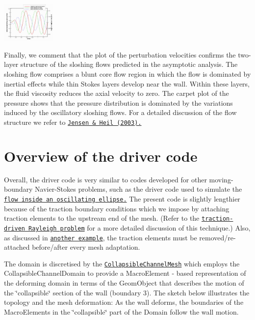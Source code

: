  
\begin{DoxyImage}
\includegraphics[width=0.20\textwidth]{trace}
\end{DoxyImage}


Finally, we comment that the plot of the perturbation velocities confirms the two-\/layer structure of the sloshing flows predicted in the asymptotic analysis. The sloshing flow comprises a blunt core flow region in which the flow is dominated by inertial effects while thin Stokes layers develop near the wall. Within these layers, the fluid viscosity reduces the axial velocity to zero. The carpet plot of the pressure shows that the pressure distribution is dominated by the variations induced by the oscillatory sloshing flows. For a detailed discussion of the flow structure we refer to \href{http://www.maths.man.ac.uk/~mheil/MATTHIAS/PDF/JensenHeil2003.pdf}{\tt Jensen \& Heil (2003).}



 

\hypertarget{index_overview}{}\section{Overview of the driver code}\label{index_overview}
Overall, the driver code is very similar to codes developed for other moving-\/boundary Navier-\/\+Stokes problems, such as the driver code used to simulate the \href{../../osc_ellipse/html/index.html}{\tt flow inside an oscillating ellipse.} The present code is slightly lengthier because of the traction boundary conditions which we impose by attaching traction elements to the upstream end of the mesh. (Refer to the \href{../../../navier_stokes/rayleigh_traction_channel/html/index.html}{\tt traction-\/driven Rayleigh problem} for a more detailed discussion of this technique.) Also, as discussed in \href{../../../poisson/two_d_poisson_flux_bc_adapt/html/index.html}{\tt another example}, the traction elements must be removed/re-\/attached before/after every mesh adaptation.

The domain is discretised by the \href{../../../meshes/mesh_list/html/index.html#collapsible_channel}{\tt {\ttfamily Collapsible\+Channel\+Mesh}} which employs the {\ttfamily Collapsible\+Channel\+Domain} to provide a {\ttfamily Macro\+Element} -\/ based representation of the deforming domain in terms of the {\ttfamily Geom\+Object} that describes the motion of the \char`\"{}collapsible\char`\"{} section of the wall (boundary 3). The sketch below illustrates the topology and the mesh deformation\+: As the wall deforms, the boundaries of the {\ttfamily Macro\+Elements} in the \char`\"{}collapsible\char`\"{} part of the {\ttfamily Domain} follow the wall motion.

